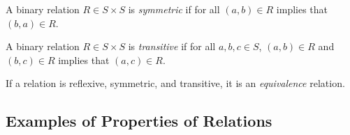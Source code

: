 \begin{definition}
    A binary relation \(R\in S\times S\) is \emph{symmetric} if for all \((a,b)\in R\) implies that \((b,a)\in R\).
\end{definition}

\begin{definition}
    A binary relation \(R\in S\times S\) is \emph{transitive} if for all \(a,b,c\in S\), \((a,b)\in R\) and \((b,c)\in R\) implies that \((a,c)\in R\).
\end{definition}

\begin{definition}
    If a relation is reflexive, symmetric, and transitive, it is an \emph{equivalence} relation. 
\end{definition}

\subsection{Examples of Properties of Relations}

